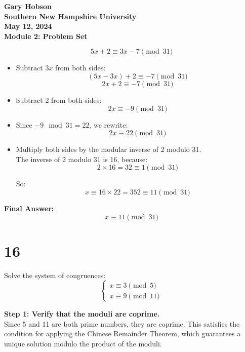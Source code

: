 \documentclass[12pt]{article}
\begin{document}
\begin{center}
    \textbf{Gary Hobson}\\
    \textbf{Southern New Hampshire University} \\
    \textbf{May 12, 2024} \\
    \textbf{Module 2: Problem Set} \\
\end{center}


\[
5x + 2 \equiv 3x - 7 \pmod{31}
\]



\begin{itemize}
    \item Subtract \( 3x \) from both sides:
    \[
    (5x - 3x) + 2 \equiv -7 \pmod{31}
    \]
    \[
    2x + 2 \equiv -7 \pmod{31}
    \]

    \item Subtract 2 from both sides:
    \[
    2x \equiv -9 \pmod{31}
    \]

    \item Since \( -9 \mod 31 = 22 \), we rewrite:
    \[
    2x \equiv 22 \pmod{31}
    \]

    \item Multiply both sides by the modular inverse of 2 modulo 31. \\
    The inverse of 2 modulo 31 is 16, because:
    \[
    2 \times 16 = 32 \equiv 1 \pmod{31}
    \]

    So:
    \[
    x \equiv 16 \times 22 = 352 \equiv 11 \pmod{31}
    \]
\end{itemize}

\textbf{Final Answer:}
\[
x \equiv 11 \pmod{31}
\]



\section*{16}

Solve the system of congruences:
\[
\begin{cases}
x \equiv 3 \pmod{5} \\
x \equiv 9 \pmod{11}
\end{cases}
\]

\textbf{Step 1: Verify that the moduli are coprime.} \\
Since 5 and 11 are both prime numbers, they are coprime. This satisfies the condition for applying the Chinese Remainder Theorem, which guarantees a unique solution modulo the product of the moduli.
\end{document}
